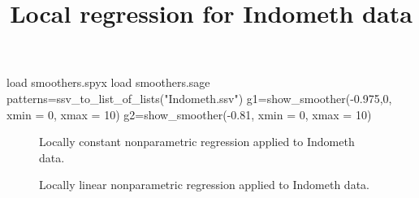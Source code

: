 \documentclass[11pt, reqno]{amsart}
\begin{document}


\title{Local regression for Indometh data} 
\maketitle


\begin{sagesilent}
load smoothers.spyx
load smoothers.sage
patterns=ssv_to_list_of_lists("Indometh.ssv")
g1=show_smoother(-0.975,0, xmin = 0, xmax = 10)
g2=show_smoother(-0.81, xmin = 0, xmax = 10)
\end{sagesilent}

\begin{figure}[h]
  \centering 
  \caption{Locally constant nonparametric regression applied to
    Indometh data.}
\end{figure}

\begin{figure}[h]
  \centering 
  \caption{Locally linear nonparametric regression applied to Indometh
    data.}
\end{figure}


\end{document}

